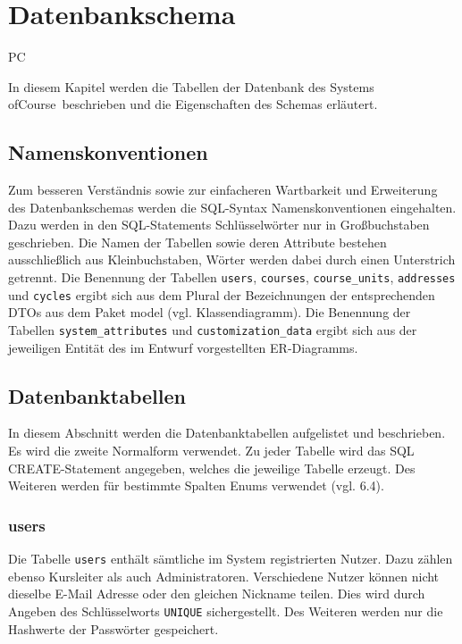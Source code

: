 \chapter{Datenbankschema}

\begin{tiny}
PC
\end{tiny}

In diesem Kapitel werden die Tabellen der Datenbank des Systems \grqq ofCourse\grqq\ beschrieben und die Eigenschaften des Schemas erläutert.

\section{Namenskonventionen}
Zum besseren Verständnis sowie zur einfacheren Wartbarkeit und Erweiterung des Datenbankschemas werden die SQL-Syntax Namenskonventionen eingehalten. Dazu werden in den SQL-Statements Schlüsselwörter nur in Großbuchstaben geschrieben. Die Namen der Tabellen sowie deren Attribute bestehen ausschließlich aus Kleinbuchstaben, Wörter werden dabei durch einen Unterstrich getrennt. Die Benennung der Tabellen \texttt{users}, \texttt{courses}, \texttt{course\_units}, \texttt{addresses} und \texttt{cycles} ergibt sich aus dem Plural der Bezeichnungen der entsprechenden DTOs aus dem Paket model (vgl. Klassendiagramm). Die Benennung der Tabellen \texttt{system\_attributes} und \texttt{customization\_data} ergibt sich aus der jeweiligen Entität des im Entwurf vorgestellten ER-Diagramms.

\section{Datenbanktabellen}
In diesem Abschnitt werden die Datenbanktabellen aufgelistet und beschrieben. Es wird die zweite Normalform verwendet. Zu jeder Tabelle wird das SQL CREATE-Statement angegeben, welches die jeweilige Tabelle erzeugt. Des Weiteren werden für bestimmte Spalten Enums verwendet (vgl. 6.4).

\subsection{users}
Die Tabelle \texttt{users} enthält sämtliche im System registrierten Nutzer. Dazu zählen ebenso Kursleiter als auch Administratoren. Verschiedene Nutzer können nicht dieselbe E-Mail Adresse oder den gleichen Nickname teilen. Dies wird durch Angeben des Schlüsselworts \texttt{UNIQUE} sichergestellt. Des Weiteren werden nur die Hashwerte der Passwörter gespeichert.
	

